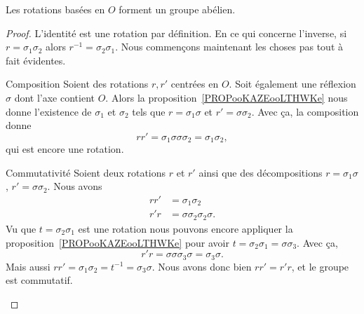 \begin{proposition}      \label{PROPooWMESooNJMdxf}
    Les rotations basées en \( O\) forment un groupe abélien.
\end{proposition}

\begin{proof}
    L'identité est une rotation par définition. En ce qui concerne l'inverse, si \( r=\sigma_1\sigma_2\) alors \( r^{-1}=\sigma_2\sigma_1\). Nous commençons maintenant les choses pas tout à fait évidentes.
    \begin{subproof}
        \item[Composition]
            Soient des rotations \( r,r'\) centrées en \( O\). Soit également une réflexion \( \sigma\) dont l'axe contient \( O\). Alors la proposition~\ref{PROPooKAZEooLTHWKe} nous donne l'existence de \( \sigma_1\) et \( \sigma_2\) tels que \( r=\sigma_1\sigma\) et \( r'=\sigma\sigma_2\). Avec ça, la composition donne
            \begin{equation}
                rr'=\sigma_1\sigma\sigma\sigma_2=\sigma_1\sigma_2,
            \end{equation}
            qui est encore une rotation.
        \item[Commutativité]
            Soient deux rotations \( r\) et \( r'\) ainsi que des décompositions \( r=\sigma_1\sigma\), \( r'=\sigma\sigma_2\). Nous avons
            \begin{subequations}
                \begin{align}
                    rr'&=\sigma_1\sigma_2\\
                    r'r&=\sigma\sigma_2\sigma_2\sigma.
                \end{align}
            \end{subequations}
            Vu que \( t=\sigma_2\sigma_1\) est une rotation nous pouvons encore appliquer la proposition~\ref{PROPooKAZEooLTHWKe} pour avoir \( t=\sigma_2\sigma_1=\sigma\sigma_3\). Avec ça,
            \begin{equation}
                r'r=\sigma\sigma\sigma_3\sigma=\sigma_3\sigma.
            \end{equation}
            Mais aussi \( rr'=\sigma_1\sigma_2=t^{-1}=\sigma_3\sigma\). Nous avons donc bien \( rr'=r'r\), et le groupe est commutatif.
    \end{subproof}
\end{proof}

